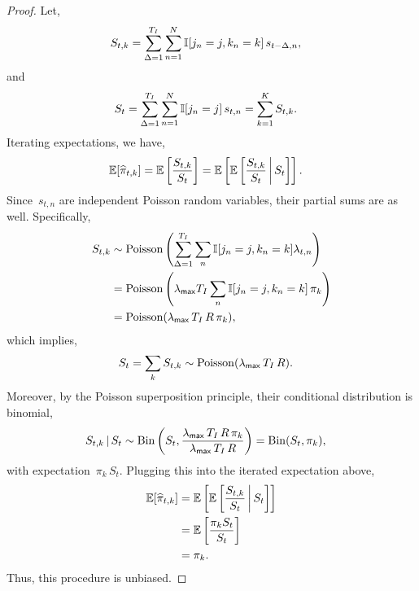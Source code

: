 \begin{proof}
  Let,
  \begin{align}
    S_{t,k} &= \sum_{\Delta = 1}^{T_I} \sum_{n=1}^N \mathbb{I}[j_n=j, k_n=k] \, s_{t-\Delta,n},
  \end{align}
  and
  \begin{align}
    S_{t} &= \sum_{\Delta = 1}^{T_I} \sum_{n=1}^N \mathbb{I}[j_n=j] \,  s_{t,n} = \sum_{k=1}^K S_{t,k}.
  \end{align}
  Iterating expectations, we have,
  \begin{align}
    \mathbb{E}[\widehat{\pi}_{t,k}] &=
    \mathbb{E} \left[ \frac{S_{t, k}}{S_{t}} \right]
    = \mathbb{E} \left[
      \mathbb{E} \left[
        \frac{S_{t,k}}{S_t} \, \bigg|\, S_{t}  
      \right] \right].
  \end{align}
  Since~$s_{t, n}$ are independent Poisson random variables, their partial
  sums are as well.  Specifically,
  \begin{align}
    S_{t,k} &\sim \mathrm{Poisson} \left( \sum_{\Delta = 1}^{T_I} \sum_{n} \mathbb{I}[j_n=j, k_n=k] \lambda_{t,n} \right) \\
    &= \mathrm{Poisson} \left(\lambda_{\mathsf{max}} T_I \sum_n \mathbb{I}[j_n=j, k_n=k] \, \pi_{k} \right) \\
    \label{eq:S_t_rate}
    &= \mathrm{Poisson}(\lambda_{\mathsf{max}} \, T_I \, R \, \pi_{k}),
  \end{align}
  which implies,
  \begin{align}
    S_{t} = \sum_{k} S_{t,k} &\sim \mathrm{Poisson}(\lambda_{\mathsf{max}} \, T_I \, R).
  \end{align}
  Moreover, by the Poisson superposition principle, their conditional
  distribution is binomial,
  \begin{align}
    S_{t,k} \,|\, S_t &\sim
    \mathrm{Bin} \left( S_t, \frac{\lambda_{\mathsf{max}} \, T_I \, R \, \pi_{k}}{\lambda_{\mathsf{max}} \, T_I \, R} \right)
    =\mathrm{Bin}(S_t, \pi_{k}),
  \end{align}
  with expectation~$\pi_{k} \, S_t$.
  Plugging this into the iterated expectation above, 
  \begin{align}
    \mathbb{E}[\widehat{\pi}_{t,k}]
    &= \mathbb{E} \left[
      \mathbb{E} \left[
        \frac{S_{t,k}}{S_t} \, \bigg|\, S_t  \right] \right] \\
    &= \mathbb{E} \left[ 
      \frac{\pi_{k} S_t}{S_t} \right]\\
    &= \pi_{k}.
  \end{align}
  Thus, this procedure is unbiased.
\end{proof}

